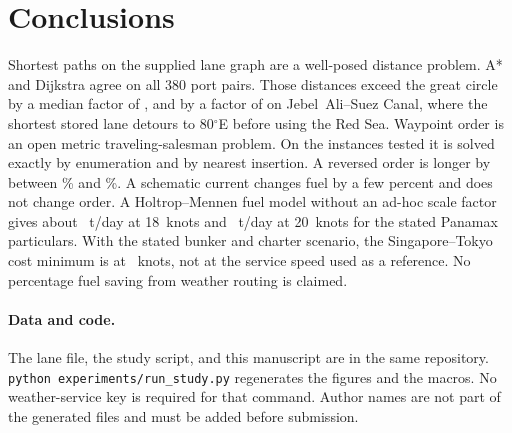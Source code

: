 \documentclass[11pt]{article}
\begin{document}
\section{Conclusions}
\label{sec:conclusions}

Shortest paths on the supplied lane graph are a well-posed distance problem.
A* and Dijkstra agree on all 380 port pairs.
Those distances exceed the great circle by a median factor of \MedianDetour, and by a factor of \MaxDetour{} on Jebel~Ali--Suez Canal, where the shortest stored lane detours to 80\(^\circ\)E before using the Red Sea.
Waypoint order is an open metric traveling-salesman problem.
On the instances tested it is solved exactly by enumeration and by nearest insertion.
A reversed order is longer by between \ReversedGapMin\% and \ReversedGapMax\%.
A schematic current changes fuel by a few percent and does not change order.
A Holtrop--Mennen fuel model without an ad-hoc scale factor gives about \FuelEighteen~t/day at 18~knots and \FuelTwenty~t/day at 20~knots for the stated Panamax particulars.
With the stated bunker and charter scenario, the Singapore--Tokyo cost minimum is at \EconomicSpeed~knots, not at the service speed used as a reference.
No percentage fuel saving from weather routing is claimed.

\paragraph{Data and code.}
The lane file, the study script, and this manuscript are in the same repository.
\texttt{python experiments/run\_study.py} regenerates the figures and the macros.
No weather-service key is required for that command.
Author names are not part of the generated files and must be added before submission.



\end{document}
